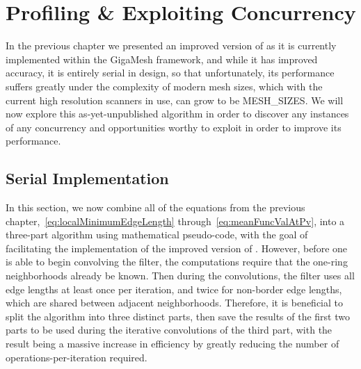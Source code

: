 \chapter{Profiling \& Exploiting Concurrency}
\label{ch5}
In the previous chapter we presented an improved version of  as it is currently implemented within the GigaMesh framework, and while it has improved accuracy, it is entirely serial in design, so that unfortunately, its performance suffers greatly under the complexity of modern mesh sizes, which with the current high resolution scanners in use, can grow to be MESH\_SIZES. We will now explore this as-yet-unpublished algorithm in order to discover any instances of any concurrency and opportunities worthy to exploit in order to improve its performance.

%
%
%
%
\section{Serial Implementation}
\label{ch5sSI}
In this section, we now combine all of the equations from the previous chapter,~\ref{eq:localMinimumEdgeLength} through~\ref{eq:meanFuncValAtPv}, into a three-part algorithm using mathematical pseudo-code, with the goal of facilitating the implementation of the improved version of . However, before one is able to begin convolving the filter, the computations require that the one-ring neighborhoods already be known. Then during the convolutions, the filter uses all edge lengths at least once per iteration, and twice for non-border edge lengths, which are shared between adjacent neighborhoods. Therefore, it is beneficial to split the algorithm into three distinct parts, then save the results of the first two parts to be used during the iterative convolutions of the third part, with the result being a massive increase in efficiency by greatly reducing the number of operations-per-iteration required.

%
%
%

